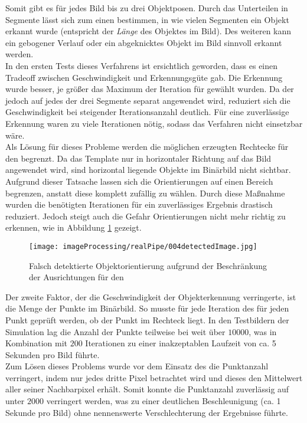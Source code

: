 Somit gibt es für jedes Bild bis zu drei Objektposen. Durch das Unterteilen in Segmente lässt sich zum einen bestimmen, in wie vielen Segmenten ein Objekt erkannt wurde (entspricht der \textit{Länge} des Objektes im Bild). Des weiteren kann ein gebogener Verlauf oder ein abgeknicktes Objekt im Bild sinnvoll erkannt werden.\\
In den ersten Tests dieses Verfahrens ist ersichtlich geworden, dass es einen Tradeoff zwischen Geschwindigkeit und Erkennungsgüte gab. Die Erkennung wurde besser, je größer das Maximum der Iteration für \rans gewählt wurden. Da der \rans jedoch auf jedes der drei Segmente separat angewendet wird, reduziert sich die Geschwindigkeit bei steigender Iterationsanzahl deutlich. Für eine zuverlässige Erkennung waren zu viele Iterationen nötig, sodass das Verfahren nicht einsetzbar wäre.\\
Als Lösung für dieses Probleme werden die möglichen erzeugten Rechtecke für den \rans begrenzt. Da das Template nur in horizontaler Richtung auf das Bild angewendet wird, sind horizontal liegende Objekte im Binärbild nicht sichtbar. Aufgrund dieser Tatsache lassen sich die Orientierungen auf einen Bereich begrenzen, anstatt diese komplett zufällig zu wählen. Durch diese Maßnahme wurden die benötigten Iterationen für ein zuverlässiges Ergebnis drastisch reduziert. Jedoch steigt auch die Gefahr Orientierungen nicht mehr richtig zu erkennen, wie in Abbildung \ref{detecFail} gezeigt.\\
\begin{figure}[H]
\centering
\texttt{[image: imageProcessing/realPipe/004detectedImage.jpg]}
\caption{Falsch detektierte Objektorientierung aufgrund der Beschränkung der Ausrichtungen für den \rans}
\label{detecFail}
\end{figure}
Der zweite Faktor, der die Geschwindigkeit der Objekterkennung verringerte, ist die Menge der Punkte im Binärbild. So musste für jede Iteration des \rans für jeden Punkt geprüft werden, ob der Punkt im Rechteck liegt. In den Testbildern der Simulation lag die Anzahl der Punkte teilweise bei weit über $10000$, was in Kombination mit $200$ Iterationen zu einer inakzeptablen Laufzeit von ca. 5 Sekunden pro Bild führte.\\
Zum Lösen dieses Problems wurde vor dem Einsatz des \rans die Punktanzahl verringert, indem nur jedes dritte Pixel betrachtet wird und dieses den Mittelwert aller seiner Nachbarpixel erhält.  Somit konnte die Punktanzahl zuverlässig auf unter $2000$ verringert werden, was zu einer deutlichen Beschleunigung (ca. 1 Sekunde pro Bild) ohne nennenswerte Verschlechterung der Ergebnisse führte.
